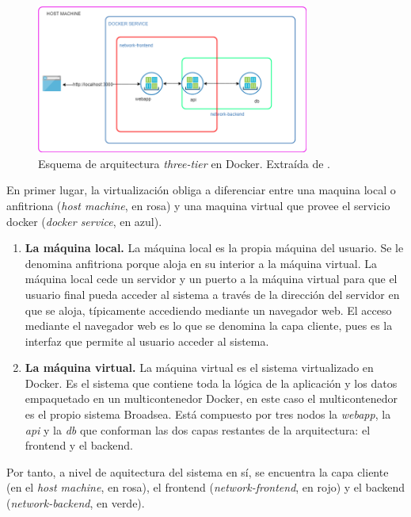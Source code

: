 \begin{figure}[H]
    \centering
    \includegraphics[width=0.80\textwidth]{figures/threetierDocker.png}
    \caption{Esquema de arquitectura \textit{three-tier} en Docker. Extraída de \cite{threetierDocker}.}
    \label{fig:threetierDocker}
\end{figure}

En primer lugar, la virtualización obliga a diferenciar entre una maquina local o anfitriona (\textit{host machine}, en rosa) y una maquina virtual que provee el servicio docker (\textit{docker service}, en azul). 

\begin{enumerate}

    \item \textbf{La máquina local.} La máquina local es la propia máquina del usuario. Se le denomina anfitriona porque aloja en su interior a la máquina virtual. La máquina local cede un servidor y un puerto a la máquina virtual para que el usuario final pueda acceder al sistema a través de la dirección del servidor en que se aloja, típicamente accediendo mediante un navegador web. El acceso mediante el navegador web es lo que se denomina la capa cliente, pues es la interfaz que permite al usuario acceder al sistema. 

    \item \textbf{La máquina virtual.} La máquina virtual es el sistema virtualizado en Docker. Es el sistema que contiene toda la lógica de la aplicación y los datos empaquetado en un multicontenedor Docker, en este caso el multicontenedor es el propio sistema Broadsea. Está compuesto por tres nodos la \textit{webapp}, la \textit{api} y la \textit{db} que conforman las dos capas restantes de la arquitectura: el frontend y el backend.
    
\end{enumerate}

Por tanto, a nivel de aquitectura del sistema en sí, se encuentra la capa cliente (en el \textit{host machine}, en rosa), el frontend (\textit{network-frontend}, en rojo) y el backend (\textit{network-backend}, en verde).


